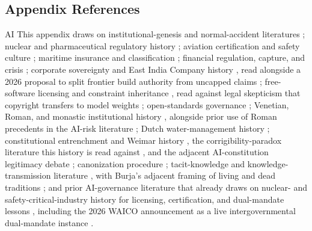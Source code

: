 \begin{refsection}
\section*{Appendix References}
\begin{authbar}{AI}
This appendix draws on institutional-genesis and normal-accident literatures \autocite{vaughan1996challenger,perrow1984normal,reason1997managingrisks}; nuclear and pharmaceutical regulatory history \autocite{mazuzan1985atom,carpenter2010reputation}; aviation certification and safety culture \autocite{herkert2020boeing}; maritime insurance and classification \autocite{kingston2007marine}; financial regulation, capture, and crisis \autocite{kroszner2014regulation,fcic2011report,white2010ratingagencies,coffee2006gatekeepers}; corporate sovereignty and East India Company history \autocite{stern2011companystate,dalrymple2019anarchy}, read alongside a 2026 proposal to split frontier build authority from uncapped claims \autocite{roko2026planr}; free-software licensing and constraint inheritance \autocite{kelty2008twobits,weber2004successopensource,fsf2007gplv3}, read against legal skepticism that copyright transfers to model weights \autocite{henderson2025mirage}; open-standards governance \autocite{russell2014openstandards}; Venetian, Roman, and monastic institutional history \autocite{lane1973venice,finlay1980politics,keaveney2007army,gruen1995lastgeneration,rost2010benedictine}, alongside prior use of Roman precedents in the AI-risk literature \autocite{miller2025precedents}; Dutch water-management history \autocite{tebrake2002tamingwaterwolf}; constitutional entrenchment and Weimar history \autocite{preuss2011eternity,evans2003comingthirdreich}, the corrigibility-paradox literature this history is read against \autocite{soares2015corrigibility,christiano2018corrigibility}, and the adjacent AI-constitution legitimacy debate \autocite{abiri2025publicconstitutional}; canonization procedure \autocite{woodward1996makingsaints}; tacit-knowledge and knowledge-transmission literature \autocite{polanyi1966tacit,collins1974teaset}, with Burja's adjacent framing of living and dead traditions \autocite{burja2018knowledge}; and prior AI-governance literature that already draws on nuclear- and safety-critical-industry history for licensing, certification, and dual-mandate lessons \autocite{anderljung2023frontier,zaidi2021baruch,law2023dualmandate}, including the 2026 {WAICO} announcement as a live intergovernmental dual-mandate instance \autocite{xi2026waic}.

\printbibliography[heading=subbibliography,title={Appendix References}]

\end{authbar}
\end{refsection}
